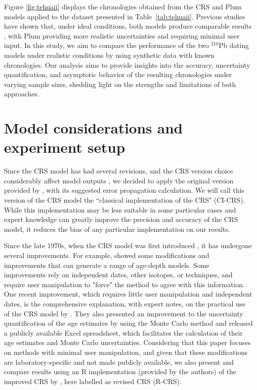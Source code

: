 \documentclass [10pt] {article}
\begin{document}
Figure \ref{fig:tehuaii} displays the chronologies obtained from the CRS and Plum models applied to the dataset presented in Table~\ref{tab:tehuaii}. Previous studies have shown that, under ideal conditions, both models produce comparable results \citep{Aquino2020}, with Plum providing more realistic uncertainties and requiring minimal user input. In this study, we aim to compare the performance of the two $^{210}$Pb dating models under realistic conditions by using synthetic data with known chronologies. Our analysis aims to provide insights into the accuracy, uncertainty quantification, and asymptotic behavior of the resulting chronologies under varying sample sizes, shedding light on the strengths and limitations of both approaches.


\section{Model considerations and experiment setup}\label{sec:exp_setup}

Since the CRS model has had several revisions, and the CRS version choice considerably affect model outputs \citep{Barsanti2020}, we decided to apply the original version provided by \citet{Appleby2001}, with its suggested error propagation calculation.  We will call this version of the CRS model the ``classical implementation of the CRS" (CI-CRS). 
While this implementation may be less suitable in some particular cases and expert knowledge can greatly improve the precision and accuracy of the CRS model, it reduces the bias of any particular implementation on our results.


Since the late 1970s, when the CRS model was first introduced \citep{Appleby1978,Robbins1978}, it has undergone several improvements.
For example, \citet{Barsanti2020} showed some modifications and improvements that can generate a range of age-depth models. Some improvements rely on independent dates, other isotopes, or techniques, and require user manipulation to "force" the method to agree with this information. One recent improvement, which requires little user manipulation and independent dates, is the comprehensive explanation, with expert notes, on the practical use of the CRS model by \citet{Sanchez-Cabeza2012}. 
They also presented an improvement to the uncertainty quantification of the age estimates by using the Monte Carlo method \citep{Sanchez-Cabeza2014} and released a publicly available Excel spreadsheet, which facilitates the calculation of their age estimates and Monte Carlo uncertainties. 
Considering that this paper focuses on methods with minimal user manipulation, and given that these modifications are laboratory-specific and not made publicly available, we also present and compare results using an R implementation (provided by the authors) of the improved CRS by \citet{Sanchez-Cabeza2014}, here labelled as revised CRS (R-CRS).
\end{document}

